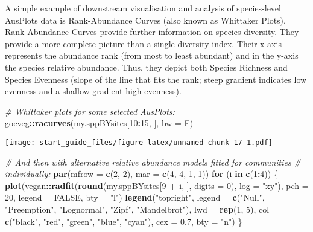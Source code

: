 \documentclass[
]{article}
\newenvironment{Shaded}{\begin{snugshade}}{\end{snugshade}}
\newcommand{\CommentTok}[1]{\textcolor[rgb]{0.56,0.35,0.01}{\textit{#1}}}
\newcommand{\ControlFlowTok}[1]{\textcolor[rgb]{0.13,0.29,0.53}{\textbf{#1}}}
\newcommand{\DataTypeTok}[1]{\textcolor[rgb]{0.13,0.29,0.53}{#1}}
\newcommand{\DecValTok}[1]{\textcolor[rgb]{0.00,0.00,0.81}{#1}}
\newcommand{\FloatTok}[1]{\textcolor[rgb]{0.00,0.00,0.81}{#1}}
\newcommand{\KeywordTok}[1]{\textcolor[rgb]{0.13,0.29,0.53}{\textbf{#1}}}
\newcommand{\NormalTok}[1]{#1}
\newcommand{\OperatorTok}[1]{\textcolor[rgb]{0.81,0.36,0.00}{\textbf{#1}}}
\newcommand{\OtherTok}[1]{\textcolor[rgb]{0.56,0.35,0.01}{#1}}
\newcommand{\StringTok}[1]{\textcolor[rgb]{0.31,0.60,0.02}{#1}}
\begin{document}
A simple example of downstream visualisation and analysis of
species-level AusPlots data is Rank-Abundance Curves (also known as
Whittaker Plots). Rank-Abundance Curves provide further information on
species diversity. They provide a more complete picture than a single
diversity index. Their x-axis represents the abundance rank (from most
to least abundant) and in the y-axis the species relative abundance.
Thus, they depict both Species Richness and Species Evenness (slope of
the line that fits the rank; steep gradient indicates low evenness and a
shallow gradient high evenness).

\begin{Shaded}
\begin{Highlighting}[]
\CommentTok{# Whittaker plots for some selected AusPlots:}
\NormalTok{goeveg}\OperatorTok{::}\KeywordTok{racurves}\NormalTok{(my.sppBYsites[}\DecValTok{10}\OperatorTok{:}\DecValTok{15}\NormalTok{, ], }\DataTypeTok{bw =}\NormalTok{ F)}
\end{Highlighting}
\end{Shaded}

\texttt{[image: start\_guide\_files/figure-latex/unnamed-chunk-17-1.pdf]}

\begin{Shaded}
\begin{Highlighting}[]

\CommentTok{# And then with alternative relative abundance models fitted for communities}
\CommentTok{# individually:}
\KeywordTok{par}\NormalTok{(}\DataTypeTok{mfrow =} \KeywordTok{c}\NormalTok{(}\DecValTok{2}\NormalTok{, }\DecValTok{2}\NormalTok{), }\DataTypeTok{mar =} \KeywordTok{c}\NormalTok{(}\DecValTok{4}\NormalTok{, }\DecValTok{4}\NormalTok{, }\DecValTok{1}\NormalTok{, }\DecValTok{1}\NormalTok{))}
\ControlFlowTok{for}\NormalTok{ (i }\ControlFlowTok{in} \KeywordTok{c}\NormalTok{(}\DecValTok{1}\OperatorTok{:}\DecValTok{4}\NormalTok{)) \{}
    \KeywordTok{plot}\NormalTok{(vegan}\OperatorTok{::}\KeywordTok{radfit}\NormalTok{(}\KeywordTok{round}\NormalTok{(my.sppBYsites[}\DecValTok{9} \OperatorTok{+}\StringTok{ }\NormalTok{i, ], }\DataTypeTok{digits =} \DecValTok{0}\NormalTok{), }\DataTypeTok{log =} \StringTok{"xy"}\NormalTok{), }\DataTypeTok{pch =} \DecValTok{20}\NormalTok{, }
        \DataTypeTok{legend =} \OtherTok{FALSE}\NormalTok{, }\DataTypeTok{bty =} \StringTok{"l"}\NormalTok{)}
    \KeywordTok{legend}\NormalTok{(}\StringTok{"topright"}\NormalTok{, }\DataTypeTok{legend =} \KeywordTok{c}\NormalTok{(}\StringTok{"Null"}\NormalTok{, }\StringTok{"Preemption"}\NormalTok{, }\StringTok{"Lognormal"}\NormalTok{, }\StringTok{"Zipf"}\NormalTok{, }\StringTok{"Mandelbrot"}\NormalTok{), }
        \DataTypeTok{lwd =} \KeywordTok{rep}\NormalTok{(}\DecValTok{1}\NormalTok{, }\DecValTok{5}\NormalTok{), }\DataTypeTok{col =} \KeywordTok{c}\NormalTok{(}\StringTok{"black"}\NormalTok{, }\StringTok{"red"}\NormalTok{, }\StringTok{"green"}\NormalTok{, }\StringTok{"blue"}\NormalTok{, }\StringTok{"cyan"}\NormalTok{), }\DataTypeTok{cex =} \FloatTok{0.7}\NormalTok{, }
        \DataTypeTok{bty =} \StringTok{"n"}\NormalTok{)}
\NormalTok{\}}
\end{Highlighting}
\end{Shaded}
\end{document}
